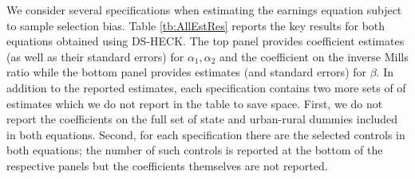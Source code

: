 \documentclass[11pt]{article}
\begin{document}
We consider several specifications when estimating the earnings equation subject to sample selection bias. Table \ref{tb:AllEstRes} reports the key results for both equations obtained using DS-HECK. The top panel provides %
coefficient estimates (as well as their standard
errors) for $\alpha_1, \alpha_2$ and the coefficient on the inverse Mills ratio
while the bottom panel provides  estimates (and standard errors) for $\beta$. %
In addition to the reported estimates, %
each specification contains two more sets of of estimates which we do not report in the table to save space. First, we do not report the coefficients on the full set of state and urban-rural dummies included in both equations. Second, for each specification there are the selected controls in both equations; the number of such controls is reported at the bottom of the respective panels but the coefficients themselves are not reported. %
\end{document}
